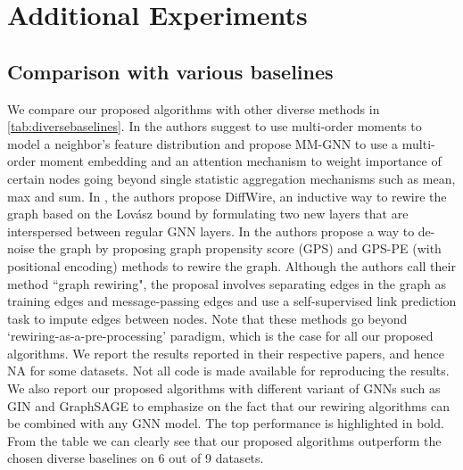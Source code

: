 \section{Additional Experiments}

\subsection{Comparison with various baselines}\label{app:diversebaselines}
We compare our proposed algorithms with other diverse methods \citep{mmgnn,diffwire,esnrgraph} in \autoref{tab:diversebaselines}. In \citep{mmgnn} the authors suggest to use multi-order moments to model a neighbor’s feature distribution and propose MM-GNN to use a multi-order moment embedding and an attention mechanism to weight importance of certain nodes going beyond single statistic aggregation mechanisms such as mean, max and sum. In \citep{diffwire}, the authors propose DiffWire, an inductive way to rewire the graph based on the Lov\'{a}sz bound by formulating two new layers that are interspersed between regular GNN layers. In \citep{esnrgraph} the authors propose a way to de-noise the graph by proposing graph propensity score (GPS) and GPS-PE (with positional encoding) methods to rewire the graph. Although the authors call their method ``graph rewiring", the proposal involves separating edges in the graph as training edges and message-passing edges and use a self-supervised link prediction task to impute edges between nodes. Note that these methods go beyond `rewiring-as-a-pre-processing' paradigm, which is the case for all our proposed algorithms. We report the results reported in their respective papers, and hence NA for some datasets. Not all code is made available for reproducing the results. We also report our proposed algorithms with different variant of GNNs such as GIN \citep{xu2018how} and GraphSAGE \citep{Hamilton:2017tp} to emphasize on the fact that our rewiring algorithms can be combined with any GNN model. The top performance is highlighted in bold. From the table we can clearly see that our proposed algorithms outperform the chosen diverse baselines on 6 out of 9 datasets.




